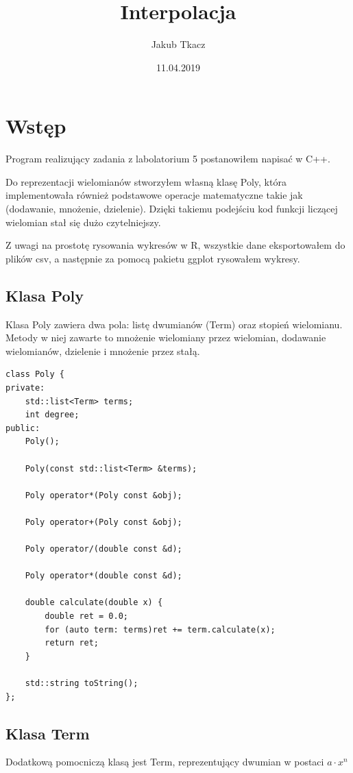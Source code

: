 \documentclass{article}
\author{Jakub Tkacz}
\title{Interpolacja}
\date{11.04.2019}
\begin{document}
    \maketitle

    \pagebreak

    \tableofcontents

    \pagebreak

    \section{Wstęp}
    Program realizujący zadania z labolatorium 5 postanowiłem napisać w C++. 

    Do reprezentacji wielomianów stworzyłem własną klasę Poly, która implementowała również podstawowe operacje matematyczne takie jak (dodawanie, mnożenie, dzielenie).
    Dzięki takiemu podejściu kod funkcji liczącej wielomian stał się dużo czytelniejszy.

    Z uwagi na prostotę rysowania wykresów w R, wszystkie dane eksportowałem do plików csv, a następnie za pomocą pakietu ggplot rysowałem wykresy.

    \subsection{Klasa Poly}
    Klasa Poly zawiera dwa pola: listę dwumianów (Term) oraz stopień wielomianu. Metody w niej zawarte to mnożenie wielomiany przez wielomian, dodawanie wielomianów, dzielenie i mnożenie przez stałą.
    \lstset {language=C++}
    \begin{lstlisting}[caption={Klasa Poly}]
class Poly {
private:
    std::list<Term> terms;
    int degree;
public:
    Poly();

    Poly(const std::list<Term> &terms);

    Poly operator*(Poly const &obj);

    Poly operator+(Poly const &obj);

    Poly operator/(double const &d);

    Poly operator*(double const &d);

    double calculate(double x) {
        double ret = 0.0;
        for (auto term: terms)ret += term.calculate(x);
        return ret;
    }

    std::string toString();
};
    \end{lstlisting}
    \subsection{Klasa Term}
    Dodatkową pomocniczą klasą jest Term, reprezentujący dwumian w postaci $a\cdot x^n$
    
\end{document}
